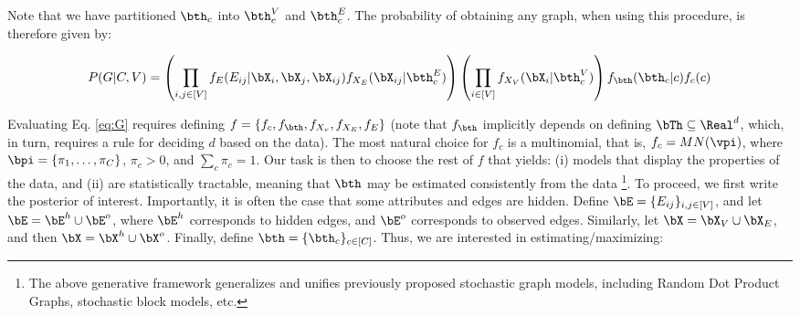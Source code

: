% 
% 

Note that we have partitioned $\bth_c$ into $\bth_c^V$ and $\bth_c^E$.  The probability of obtaining any graph, when using this procedure, is therefore given by:

\begin{align} \label{eq:G}
	P(G | C,V) = \left(\prod_{i,j \in [V]} f_E(E_{ij} | \bX_i, \bX_j, \bX_{ij}) f_{X_E}(\bX_{ij} | \bth_c^E) \right) \left(\prod_{i \in [V]} f_{X_V}(\bX_i | \bth_c^V) \right) f_{\bth}(\bth_c | c)  f_c(c)
\end{align}

Evaluating Eq. \ref{eq:G} requires defining $f=\{f_c, f_{\bth}, f_{X_v}, f_{X_E}, f_E\}$ (note that $f_{\bth}$ implicitly depends on defining $\bTh \subseteq \Real^d$, which, in turn, requires a rule for deciding $d$ based on the data).  The most natural choice for $f_c$ is a multinomial, that is, $f_c = MN(\vpi)$, where $\bpi = \{\pi_1, \ldots, \pi_C\}$, $\pi_c>0$, and $\sum_c \pi_c = 1$.   Our task is then to choose the rest of $f$ that yields: (i) models that display the properties of the data, and (ii) are statistically tractable, meaning that $\bth$ may be estimated consistently from the data \footnote{The above generative framework generalizes and unifies previously proposed stochastic graph models, including Random Dot Product Graphs, stochastic block models, etc.}.  To proceed, we first write the posterior of interest.  Importantly, it is often the case that some attributes and edges are hidden.  Define $\bE=\{E_{ij}\}_{i,j \in [V]}$, and let $\bE = \bE^h \cup \bE^o$, where $\bE^h$ corresponds to hidden edges, and $\bE^o$ corresponds to observed edges.  Similarly,  let $\bX = \bX_V \cup \bX_E$, and then $\bX= \bX^h \cup \bX^o$. Finally, define $\bth=\{\bth_c\}_{c \in [C]}$. Thus, we are interested in estimating/maximizing:


